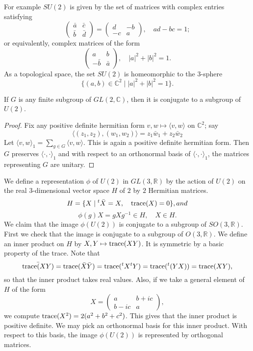 \documentclass{llncs}
\def\op#1{{\hbox{#1}}}
\newcommand{\ring}[1]{\mathbb{#1}}
\def\t#1{\hbox{}^t#1}
\begin{document}
For example $SU(2)$ is given by the set of matrices with complex entries satisfying
\[
\begin{pmatrix}{\bar a} & {\bar c} \\ \bar b & \bar d\end{pmatrix} = 
\begin{pmatrix}d & - b\\ -c & a \end{pmatrix},\quad ad - bc = 1;
\]
or equivalently, complex matrices of the form
\[
\begin{pmatrix}a & b\\ -\bar b & \bar a\end{pmatrix},\quad |a|^2 + |b|^2 = 1.
\]
As a topological space, the set $SU(2)$ is homeomorphic to
 the $3$-sphere 
$$\{(a,b)\in \ring{C}^2\mid |a|^2 + |b|^2 = 1\}.$$


\begin{lemma} If $G$ is any finite subgroup of $GL(2,\ring{C})$, then it is
conjugate to a subgroup of $U(2)$.
\end{lemma}

\begin{proof} Fix any positive definite hermitian form $v,w\mapsto \langle v,w\rangle $ on $\ring{C}^2$;
say 
\[\langle (z_1,z_2),(w_1,w_2)\rangle  = z_1 \bar w_1 + z_2 \bar w_2\]
Let $\langle v,w\rangle_1 = \sum_{g\in G} \langle v,w\rangle$.  This is again a positive definite
hermitian form.    Then $G$ preserves $\langle\cdot,\cdot\rangle_1$ and with respect 
to an orthonormal basis  of $\langle\cdot,\cdot\rangle_1$, the matrices representing $G$ are unitary.
\end{proof}

We define a representation $\phi$ of $U(2)$ in $GL(3,\ring{R})$ by the action of $U(2)$ on the real $3$-dimensional
 vector space $H$
of $2$ by $2$ Hermitian matrices.
\[
H = \{ X \mid \t{\bar X} = X,\quad \op{trace}(X)=0\}, and 
\]
  \[
   \phi(g) X = {g} X g^{-1} \in H, \quad X\in H.
  \]
We claim that the image $\phi(U(2))$ is conjugate to a subgroup of  $SO(3,\ring{R})$.
First we check that the image is conjugate to a subgroup of $O(3,\ring{R})$.  We define an inner product
on $H$ by  $X,Y\mapsto \op{trace}(XY)$.  It is symmetric by a basic property of the trace.  Note that 
\[
\bar {\op{trace}(XY)} = \op{trace}(\bar X \bar Y) = \op{trace}(\t{X}\t{Y}) = \op{trace}(\t{(YX)}) = \op{trace}(XY),
\]
so that the inner product takes real values.
Also, if we take a general element of $H$ of the form
\[
X = \begin{pmatrix} a & b + i c \\ b - i c & a\end{pmatrix},
\]
we compute $\op{trace}(X^2) = 2 (a^2 + b^2 + c^2)$.  This gives that the inner product is positive definite.  We may
pick an orthonormal basis for this inner product.  With respect to this basis, the image $\phi(U(2))$
is represented by orthogonal matrices.
\end{document}
